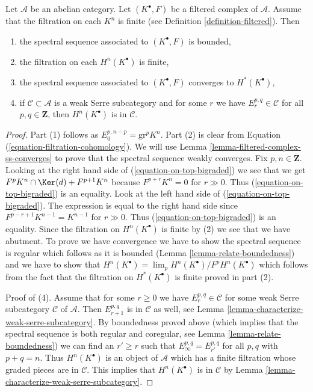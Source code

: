 \begin{lemma}
\label{lemma-biregular-ss-converges}
Let $\mathcal{A}$ be an abelian category. Let $(K^\bullet, F)$ be a
filtered complex of $\mathcal{A}$. Assume that the filtration on each $K^n$
is finite (see Definition \ref{definition-filtered}). Then
\begin{enumerate}
\item the spectral sequence associated to $(K^\bullet, F)$ is bounded,
\item the filtration on each $H^n(K^\bullet)$ is finite,
\item the spectral sequence associated to $(K^\bullet, F)$ converges
to $H^*(K^\bullet)$,
\item if $\mathcal{C} \subset \mathcal{A}$ is a weak Serre subcategory
and for some $r$ we have $E_r^{p, q} \in \mathcal{C}$ for all
$p, q \in \mathbf{Z}$, then $H^n(K^\bullet)$ is in $\mathcal{C}$.
\end{enumerate}
\end{lemma}

\begin{proof}
Part (1) follows as $E_0^{p, n - p} = \text{gr}^p K^n$.
Part (2) is clear from Equation (\ref{equation-filtration-cohomology}).
We will use Lemma \ref{lemma-filtered-complex-ss-converges} to prove
that the spectral sequence weakly converges. Fix $p, n \in \mathbf{Z}$.
Looking at the right hand side of (\ref{equation-on-top-bigraded})
we see that we get $F^pK^n \cap \Ker(d) + F^{p + 1}K^n$ because
$F^{p + r}K^n = 0$ for $r \gg 0$. Thus (\ref{equation-on-top-bigraded})
is an equality. Look at the left hand side of (\ref{equation-on-top-bigraded}).
The expression is equal to the right hand side since
$F^{p - r + 1}K^{n - 1} = K^{n - 1}$ for $r \gg 0$.
Thus (\ref{equation-on-top-bigraded}) is an equality. Since the filtration
on $H^n(K^\bullet)$ is finite by (2) we see that we have abutment.
To prove we have convergence we have to show the spectral sequence is
regular which follows as it is bounded
(Lemma \ref{lemma-relate-boundedness}) and we have
to show that $H^n(K^\bullet) = \lim_p H^n(K^\bullet)/F^pH^n(K^\bullet)$
which follows from the fact that the filtration on $H^*(K^\bullet)$
is finite proved in part (2).

\medskip\noindent
Proof of (4). Assume that for some $r \geq 0$ we have
$E_r^{p, q} \in \mathcal{C}$ for some weak Serre subcategory
$\mathcal{C}$ of $\mathcal{A}$. Then $E_{r + 1}^{p, q}$ is
in $\mathcal{C}$ as well, see
Lemma \ref{lemma-characterize-weak-serre-subcategory}.
By boundedness proved above (which implies that the spectral sequence
is both regular and coregular, see Lemma \ref{lemma-relate-boundedness})
we can find an $r' \geq r$ such that $E_\infty^{p, q} = E_{r'}^{p, q}$
for all $p, q$ with $p + q = n$. Thus $H^n(K^\bullet)$ is an object
of $\mathcal{A}$ which has a finite filtration whose graded pieces
are in $\mathcal{C}$. This implies that $H^n(K^\bullet)$ is in $\mathcal{C}$
by Lemma \ref{lemma-characterize-weak-serre-subcategory}.
\end{proof}

